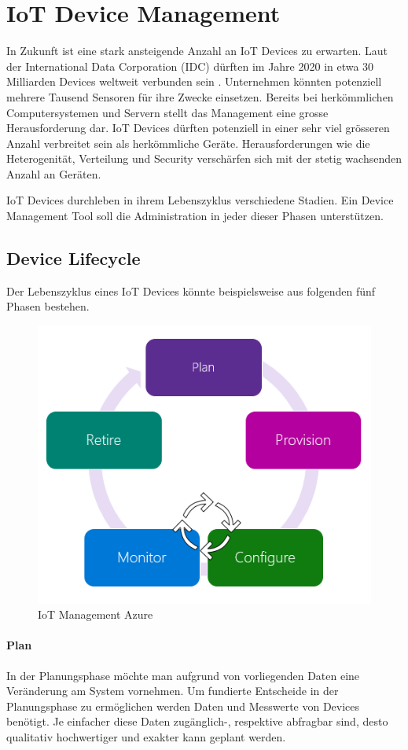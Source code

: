 \chapter{IoT Device Management}
In Zukunft ist eine stark ansteigende Anzahl an IoT Devices zu erwarten. Laut der International Data Corporation (IDC) dürften im Jahre 2020 in etwa 30 Milliarden Devices weltweit verbunden sein \cite{IDC15}. Unternehmen könnten potenziell mehrere Tausend Sensoren für ihre Zwecke einsetzen. Bereits bei herkömmlichen Computersystemen und Servern stellt das Management eine grosse Herausforderung dar. IoT Devices dürften potenziell in einer sehr viel grösseren Anzahl verbreitet sein als herkömmliche Geräte. Herausforderungen wie die Heterogenität, Verteilung und Security verschärfen sich mit der stetig wachsenden Anzahl an Geräten. 

IoT Devices durchleben in ihrem Lebenszyklus verschiedene Stadien. Ein Device Management Tool soll die Administration in jeder dieser Phasen unterstützen.
\section{Device Lifecycle}
Der Lebenszyklus eines IoT Devices könnte beispielsweise aus folgenden fünf Phasen bestehen.
\begin{figure}[H]
\centering
\includegraphics[scale=0.5]{../02_Analyse/images/hubdevmgmt-azure.png}
\caption{IoT Management Azure \cite{IoTMgmtAzure}}
\end{figure}
\subsubsection{Plan}
In der Planungsphase möchte man aufgrund von vorliegenden Daten eine Veränderung am System vornehmen. Um fundierte Entscheide in der Planungsphase zu ermöglichen werden Daten und Messwerte von Devices benötigt. Je einfacher diese Daten zugänglich-, respektive abfragbar sind, desto qualitativ hochwertiger und exakter kann geplant werden.

